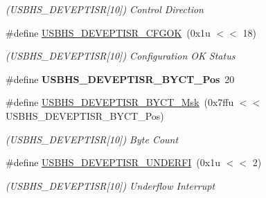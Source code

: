 \begin{DoxyCompactItemize}
\begin{DoxyCompactList}\small\item\em (U\+S\+B\+H\+S\+\_\+\+D\+E\+V\+E\+P\+T\+I\+SR\mbox{[}10\mbox{]}) Control Direction \end{DoxyCompactList}\item 
\mbox{\label{group__SAME70__USBHS_gab11ea1f5bd0a35cb8ba91d188561bd13}} 
\#define \mbox{\hyperlink{group__SAME70__USBHS_gab11ea1f5bd0a35cb8ba91d188561bd13}{U\+S\+B\+H\+S\+\_\+\+D\+E\+V\+E\+P\+T\+I\+S\+R\+\_\+\+C\+F\+G\+OK}}~(0x1u $<$$<$ 18)
\begin{DoxyCompactList}\small\item\em (U\+S\+B\+H\+S\+\_\+\+D\+E\+V\+E\+P\+T\+I\+SR\mbox{[}10\mbox{]}) Configuration OK Status \end{DoxyCompactList}\item 
\mbox{\label{group__SAME70__USBHS_gad6c9e40343f3741743d60f17568c13e0}} 
\#define {\bfseries U\+S\+B\+H\+S\+\_\+\+D\+E\+V\+E\+P\+T\+I\+S\+R\+\_\+\+B\+Y\+C\+T\+\_\+\+Pos}~20
\item 
\mbox{\label{group__SAME70__USBHS_ga2e48723f821a7a4a14d06945389604f1}} 
\#define \mbox{\hyperlink{group__SAME70__USBHS_ga2e48723f821a7a4a14d06945389604f1}{U\+S\+B\+H\+S\+\_\+\+D\+E\+V\+E\+P\+T\+I\+S\+R\+\_\+\+B\+Y\+C\+T\+\_\+\+Msk}}~(0x7ffu $<$$<$ U\+S\+B\+H\+S\+\_\+\+D\+E\+V\+E\+P\+T\+I\+S\+R\+\_\+\+B\+Y\+C\+T\+\_\+\+Pos)
\begin{DoxyCompactList}\small\item\em (U\+S\+B\+H\+S\+\_\+\+D\+E\+V\+E\+P\+T\+I\+SR\mbox{[}10\mbox{]}) Byte Count \end{DoxyCompactList}\item 
\mbox{\label{group__SAME70__USBHS_ga3402a7aff01b4227937cf65febb10cd1}} 
\#define \mbox{\hyperlink{group__SAME70__USBHS_ga3402a7aff01b4227937cf65febb10cd1}{U\+S\+B\+H\+S\+\_\+\+D\+E\+V\+E\+P\+T\+I\+S\+R\+\_\+\+U\+N\+D\+E\+R\+FI}}~(0x1u $<$$<$ 2)
\begin{DoxyCompactList}\small\item\em (U\+S\+B\+H\+S\+\_\+\+D\+E\+V\+E\+P\+T\+I\+SR\mbox{[}10\mbox{]}) Underflow Interrupt \end{DoxyCompactList}\item 
\mbox{\label{group__SAME70__USBHS_gadb464c9795a551ffbc5f8caf82a300f4}} 
$$
\end{DoxyCompactItemize}
